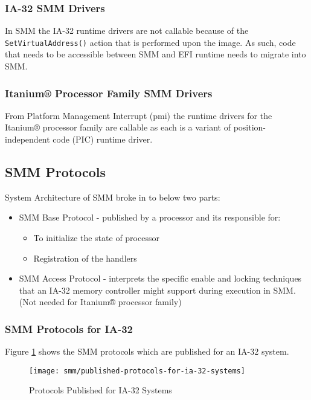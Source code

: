 \subsubsection{IA-32 SMM Drivers}
In SMM the IA-32 runtime drivers are not callable because of the \verb|SetVirtualAddress()| action that is performed upon the image. As such, code that needs to be accessible between SMM and EFI runtime needs to migrate into SMM.

\subsubsection{Itanium® Processor Family SMM Drivers}
From Platform Management Interrupt (\gls{pmi}) the runtime drivers for the Itanium® processor family are callable as each is a variant of position-independent code (PIC) runtime driver.

\subsection{SMM Protocols}\label{subsection-smm-protocols}
System Architecture of SMM broke in to below two parts:
\begin{itemize}
	\item SMM Base Protocol - published by a processor and its responsible for: 
		\begin{itemize}
			\item To initialize the state of processor
			\item Registration of the handlers
		\end{itemize}
	\item SMM Access Protocol - interprets the specific enable and locking techniques that an IA-32 memory controller might support during execution in SMM. (Not needed for Itanium® processor family)
\end{itemize}

\subsubsection{SMM Protocols for IA-32}
Figure \ref{fig:published-protocols-for-ia-32-systems} shows the SMM protocols which are published for an IA-32 system.
\begin{figure}[!htbp]
	\centering
	\texttt{[image: smm/published-protocols-for-ia-32-systems]}
	\caption{Protocols Published for IA-32 Systems}\label{fig:published-protocols-for-ia-32-systems}
\end{figure}


